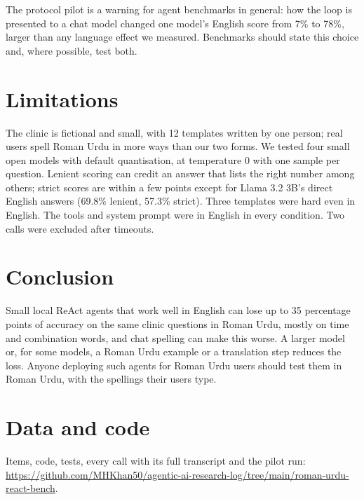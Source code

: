 \documentclass[11pt]{article}
\begin{document}
The protocol pilot is a warning for agent benchmarks in general: how the loop is presented to a chat model changed one model's English score from 7\% to 78\%, larger than any language effect we measured. Benchmarks should state this choice and, where possible, test both.

\section{Limitations}
The clinic is fictional and small, with 12 templates written by one person; real users spell Roman Urdu in more ways than our two forms. We tested four small open models with default quantisation, at temperature 0 with one sample per question. Lenient scoring can credit an answer that lists the right number among others; strict scores are within a few points except for Llama 3.2 3B's direct English answers (69.8\% lenient, 57.3\% strict). Three templates were hard even in English. The tools and system prompt were in English in every condition. Two calls were excluded after timeouts.

\section{Conclusion}
Small local ReAct agents that work well in English can lose up to 35 percentage points of accuracy on the same clinic questions in Roman Urdu, mostly on time and combination words, and chat spelling can make this worse. A larger model or, for some models, a Roman Urdu example or a translation step reduces the loss. Anyone deploying such agents for Roman Urdu users should test them in Roman Urdu, with the spellings their users type.

\section*{Data and code}
Items, code, tests, every call with its full transcript and the pilot run: \url{https://github.com/MHKhan50/agentic-ai-research-log/tree/main/roman-urdu-react-bench}.



\end{document}

